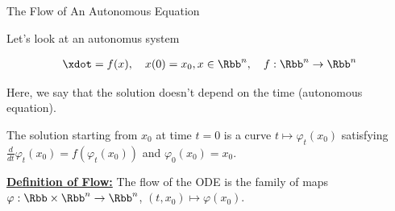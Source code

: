 \documentclass[aspectratio=169,xcolor=dvipsnames,svgnames,x11names,fleqn]{beamer}
\begin{document}
\begin{frame}{The Flow of An Autonomous Equation}

    \small

Let's look at an autonomus system

\begin{tcolorbox}[
    enhanced,
    sharp corners,
    boxrule=1pt, 
    leftrule=2mm, 
    colframe=vcGold,
    colback=WarmWhite,
    notitle,
    left=2mm 
]
\begin{align*}
    \xdot = f(x), \quad x(0) = x_0, x \in \Rbb^n, \quad f:\Rbb^n \to \Rbb^n
\end{align*}
\end{tcolorbox}

Here, we say that the solution doesn't depend on the time (autonomous equation).

\begin{tcolorbox}[
    enhanced,
    sharp corners,
    boxrule=1pt, 
    leftrule=1mm, 
    colframe=Rust,
    colback=white,
    notitle,
    left=2mm 
]
The solution starting from $x_0$ at time $t = 0$ is a curve $t \mapsto \varphi_t(x_0)$ satisfying $\frac{d}{dt}\varphi_t(x_0) = f(\varphi_t(x_0))$ and $\varphi_0(x_0) = x_0$.
\end{tcolorbox}

\textbf{\underline{Definition of Flow:}} {\color{mainNavy} The flow of the ODE is the family of maps $\varphi: \Rbb \times \Rbb^n \to \Rbb^n$, $(t, x_0) \mapsto \varphi(x_0)$.}


\end{frame}
\end{document}
